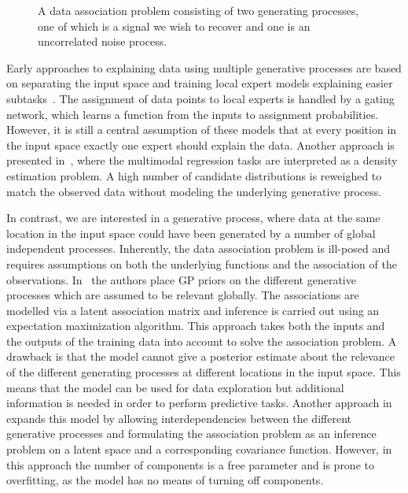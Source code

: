 \begin{figure}[t]
    \centering
    
    \caption[A data association problem]{
        \label{fig:data_association:choicenet_data}
        A data association problem consisting of two generating processes, one of which is a signal we wish to recover and one is an uncorrelated noise process.
    }
\end{figure}
Early approaches to explaining data using multiple generative processes are based on separating the input space and training local expert models explaining easier subtasks~\parencite{jacobs_adaptive_1991,tresp_mixtures_2001, rasmussen_infinite_2002}.
The assignment of data points to local experts is handled by a gating network, which learns a function from the inputs to assignment probabilities.
However, it is still a central assumption of these models that at every position in the input space exactly one expert should explain the data.
Another approach is presented in~\parencite{bishop_mixture_1994}, where the multimodal regression tasks are interpreted as a density estimation problem.
A high number of candidate distributions is reweighed to match the observed data without modeling the underlying generative process.

In contrast, we are interested in a generative process, where data at the same location in the input space could have been generated by a number of global independent processes.
Inherently, the data association problem is ill-posed and requires assumptions on both the underlying functions and the association of the observations.
In~\parencite{lazaro-gredilla_overlapping_2012} the authors place GP priors on the different generative processes which are assumed to be relevant globally.
The associations are modelled via a latent association matrix and inference is carried out using an expectation maximization algorithm.
This approach takes both the inputs and the outputs of the training data into account to solve the association problem.
A drawback is that the model cannot give a posterior estimate about the relevance of the different generating processes at different locations in the input space.
This means that the model can be used for data exploration but additional information is needed in order to perform predictive tasks.
Another approach in~\parencite{bodin_latent_2017} expands this model by allowing interdependencies between the different generative processes and formulating the association problem as an inference problem on a latent space and a corresponding covariance function.
However, in this approach the number of components is a free parameter and is prone to overfitting, as the model has no means of turning off components.

